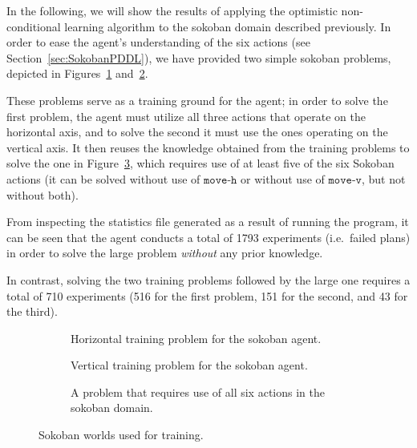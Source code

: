 \documentclass[../Master.tex]{subfiles}
\begin{document}
In the following, we will show the results of applying the optimistic non-conditional learning algorithm to the sokoban domain described previously. In order to ease the agent's understanding of the  six actions (see Section~\ref{sec:SokobanPDDL}), we have provided two simple sokoban problems, depicted in Figures~\ref{fig:results:train1} and~\ref{fig:results:train2}. 

These problems serve as a training ground for the agent; in order to solve the first problem, the agent must utilize all three actions that operate on the horizontal axis, and to solve the second it must use the ones operating on the vertical axis. It then reuses the knowledge obtained from the training problems to solve the one in Figure~\ref{fig:results:train3}, which requires use of at least five of the six Sokoban actions (it can be solved without use of $\texttt{move-h}$ or without use of $\texttt{move-v}$, but not without both).

From inspecting the statistics file generated as a result of running the program, it can be seen that the agent conducts a total of 1793 experiments (i.e.\ failed plans) in order to solve the large problem \textit{without} any prior knowledge.

In contrast, solving the two training problems followed by the large one requires a total of 710 experiments (516 for the first problem, 151 for the second, and 43 for the third).

\begin{figure}
    \begin{subfigure}{0.3\textwidth}
        \resizebox{\linewidth}{!}{}
        \caption{Horizontal training problem for the sokoban agent.}\label{fig:results:train1}
    \end{subfigure}
    \begin{subfigure}{0.3\textwidth}
        \resizebox{\linewidth}{!}{}
        \caption{Vertical training problem for the sokoban agent.}\label{fig:results:train2}
    \end{subfigure}
    \begin{subfigure}{0.3\textwidth}
        \resizebox{\linewidth}{!}{}
        \caption{A problem that requires use of all six actions in the sokoban domain.}\label{fig:results:train3}
    \end{subfigure}
    \caption{Sokoban worlds used for training.}\label{fig:results:sokoTraining}
\end{figure}
\end{document}
